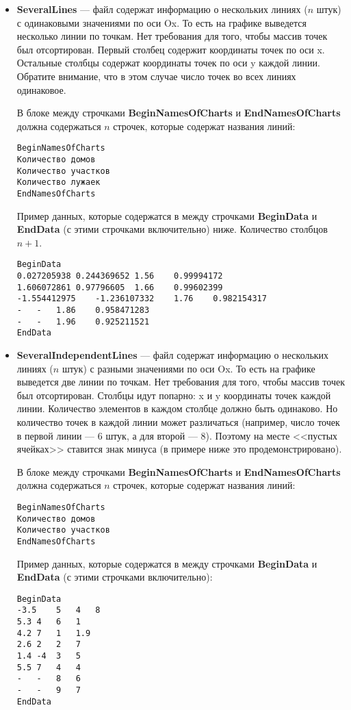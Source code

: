 \documentclass[a4paper,12pt]{article}
\begin{document}
\begin{itemize}
\begin{itemize}
\item \textbf{SeveralLines} --- файл содержат информацию о нескольких линиях ($n$ штук) с одинаковыми значениями по оси Ox. То есть на графике выведется несколько линии по точкам. Нет требования для того, чтобы массив точек был отсортирован. Первый столбец содержит координаты точек по оси x. Остальные столбцы содержат координаты точек по оси y каждой линии. Обратите внимание, что в этом случае число точек во всех линиях одинаковое.

В блоке между строчками \textbf{BeginNamesOfCharts} и \textbf{EndNamesOfCharts} должна содержаться $ n $ строчек, которые содержат названия линий:
\begin{lstlisting}[label=Line03_8,caption=Для SeveralLines ]
BeginNamesOfCharts
Количество домов
Количество участков
Количество лужаек
EndNamesOfCharts
\end{lstlisting}

Пример данных, которые содержатся в между строчками \textbf{BeginData} и \textbf{EndData} (с этими строчками включительно) ниже.  Количество столбцов $n+1$.
\begin{lstlisting}[label=Line03_9,caption=Для SeveralLines ]
BeginData
0.027205938	0.244369652	1.56	0.99994172
1.606072861	0.97796605	1.66	0.99602399
-1.554412975	-1.236107332	1.76	0.982154317
-	-	1.86	0.958471283
-	-	1.96	0.925211521
EndData
\end{lstlisting}

\item \textbf{SeveralIndependentLines} --- файл содержат информацию о нескольких линиях ($n$ штук) с разными значениями по оси Ox. То есть на графике выведется две линии по точкам. Нет требования для того, чтобы массив точек был отсортирован. Столбцы идут попарно: x и y координаты точек каждой линии. Количество элементов в каждом столбце должно быть одинаково. Но количество точек в каждой линии может различаться (например, число точек в первой линии --- 6 штук, а для второй --- 8). Поэтому на месте <<пустых ячейках>> ставится знак минуса (в примере ниже это продемонстрировано).

В блоке между строчками \textbf{BeginNamesOfCharts} и \textbf{EndNamesOfCharts} должна содержаться $n$ строчек, которые содержат названия линий:
\begin{lstlisting}[label=Line03_9,caption=Для SeveralIndependentLines ]
BeginNamesOfCharts
Количество домов
Количество участков
EndNamesOfCharts
\end{lstlisting}

Пример данных, которые содержатся в между строчками \textbf{BeginData} и \textbf{EndData} (с этими строчками включительно):
\begin{lstlisting}[label=Line03_10,caption=Для SeveralIndependentLines ]
BeginData
-3.5	5	4	8
5.3	4	6	1
4.2	7	1	1.9
2.6	2	2	7
1.4	-4	3	5
5.5	7	4	4
-	-	8	6
-	-	9	7
EndData
\end{lstlisting}


\end{itemize}
\end{itemize}
\end{document}
